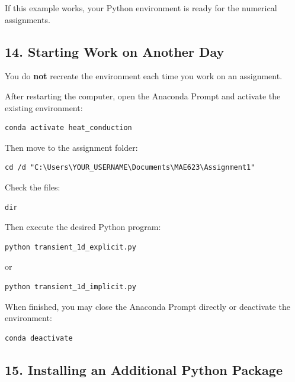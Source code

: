 \documentclass[11pt]{article}
\begin{document}
If this example works, your Python environment is ready for the
numerical assignments.

\subsection*{14. Starting Work on Another Day}

You do \textbf{not} recreate the environment each time you work on an
assignment.

After restarting the computer, open the Anaconda Prompt and activate
the existing environment:

\begin{lstlisting}
conda activate heat_conduction
\end{lstlisting}

Then move to the assignment folder:

\begin{lstlisting}
cd /d "C:\Users\YOUR_USERNAME\Documents\MAE623\Assignment1"
\end{lstlisting}

Check the files:

\begin{lstlisting}
dir
\end{lstlisting}

Then execute the desired Python program:

\begin{lstlisting}
python transient_1d_explicit.py
\end{lstlisting}

or

\begin{lstlisting}
python transient_1d_implicit.py
\end{lstlisting}

When finished, you may close the Anaconda Prompt directly or deactivate
the environment:

\begin{lstlisting}
conda deactivate
\end{lstlisting}

\subsection*{15. Installing an Additional Python Package}
\end{document}
